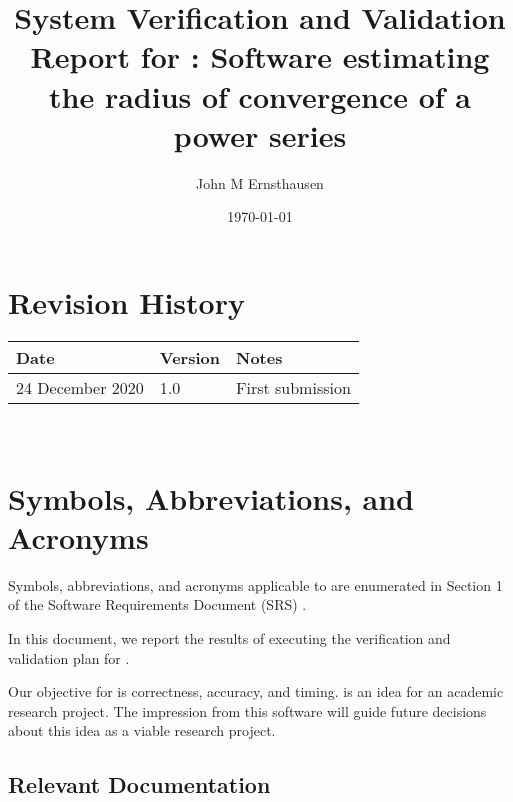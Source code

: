 \documentclass[12pt, titlepage]{article}
\begin{document}
\title{System Verification and Validation Report for :
Software estimating the radius of convergence of a power series} 
\author{John M Ernsthausen}
\date{\today}
	
\maketitle


\section{Revision History}

\begin{tabularx}{\textwidth}{p{4cm}p{2cm}X}
\toprule {\bf Date} & {\bf Version} & {\bf Notes}\\
\midrule
24 December 2020 & 1.0 & First submission\\
\bottomrule
\end{tabularx}

~~\newpage

\section{Symbols, Abbreviations, and Acronyms}

Symbols, abbreviations, and acronyms applicable to  are enumerated
in Section 1 of the Software Requirements Document (SRS) \citep{SRS}.

\newpage

\tableofcontents



\newpage


In this document, we report the results of executing the verification and validation
plan for .

Our objective for  is correctness, accuracy, and timing.  is
an idea for an academic research project. The impression from this software will
guide future decisions about this idea as a viable research project.

\subsection{Relevant Documentation}
\end{document}
